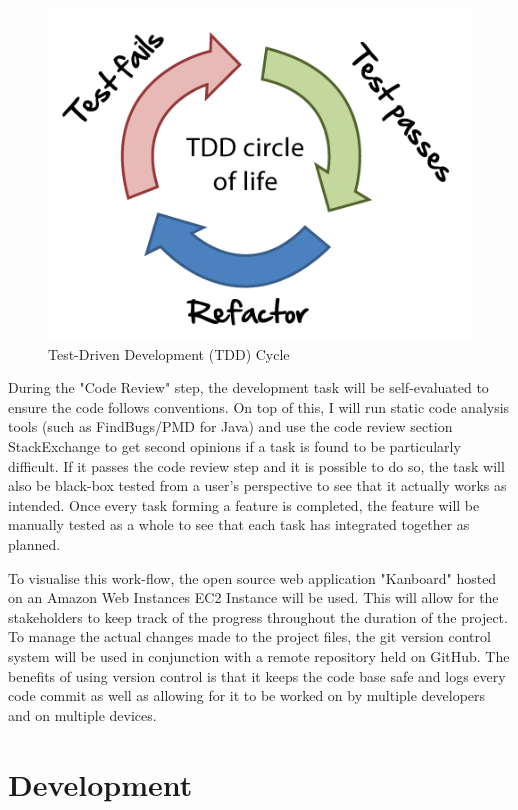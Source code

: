 \documentclass[]{report}
\begin{document}
	\begin{figure}[H]
		\caption{
			Test-Driven Development (TDD) Cycle
			\cite{TDD Diagram}
		}
		\centering
		\includegraphics[scale=0.5]{tdd-circle-of-life.png}
	\end{figure}
	
	During the "Code Review" step, the development task will be self-evaluated to ensure the code follows conventions. On top of this, I will run static code analysis tools (such as FindBugs/PMD for Java) and use the code review section StackExchange to get second opinions if a task is found to be particularly difficult. If it passes the code review step and it is possible to do so, the task will also be black-box tested from a user's perspective to see that it actually works as intended. Once every task forming a feature is completed, the feature will be manually tested as a whole to see that each task has integrated together as planned.
	
	To visualise this work-flow, the open source web application "Kanboard" hosted on an Amazon Web Instances EC2 Instance will be used. This will allow for the stakeholders to keep track of the progress throughout the duration of the project. To manage the actual changes made to the project files, the git version control system will be used in conjunction with a remote repository held on GitHub. The benefits of using version control is that it keeps the code base safe and logs every code commit as well as allowing for it to be worked on by multiple developers and on multiple devices. 
	
	\chapter{Development}
\end{document}
